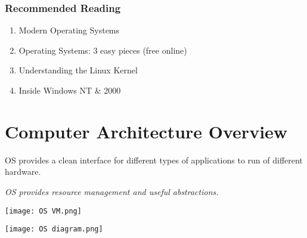 \documentclass{report}
\begin{document}
            \subsubsection*{Recommended Reading}
                \begin{enumerate}
                    \item Modern Operating Systems
                    \item Operating Systems: 3 easy pieces (free online)
                    \item Understanding the Linux Kernel
                    \item Inside Windows NT \& 2000
                \end{enumerate}
    
    \section*{Computer Architecture Overview}
        OS provides a clean interface for different types of applications to run of different hardware.
        \\ \centerline{\textit{OS provides resource management and useful abstractions.}}
        \begin{center}
            \texttt{[image: OS VM.png]} \\
        \end{center}
        \begin{center}
            \texttt{[image: OS diagram.png]}
        \end{center}
\end{document}
